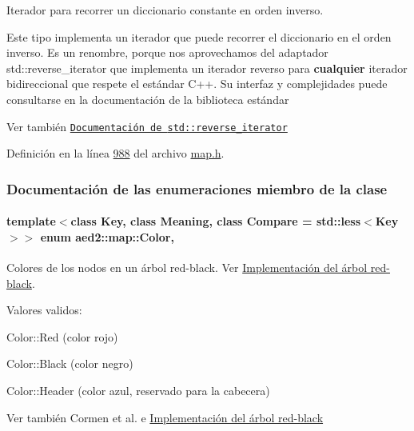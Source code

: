 Iterador para recorrer un diccionario constante en orden inverso. 

Este tipo implementa un iterador que puede recorrer el diccionario en el orden inverso. Es un renombre, porque nos aprovechamos del adaptador {\ttfamily std\+::reverse\+\_\+iterator} que implementa un iterador reverso para {\bfseries cualquier} iterador bidireccional que respete el estándar C++. Su interfaz y complejidades puede consultarse en la documentación de la biblioteca estándar

\begin{DoxySeeAlso}{Ver también}
\href{http://en.cppreference.com/w/cpp/iterator/reverse_iterator}{\tt Documentación de {\ttfamily std\+::reverse\+\_\+iterator}} 
\end{DoxySeeAlso}


Definición en la línea \hyperlink{map_8h_source_l00988}{988} del archivo \hyperlink{map_8h_source}{map.\+h}.



\subsubsection{Documentación de las enumeraciones miembro de la clase}
\paragraph[{\texorpdfstring{Color}{Color}}]{\setlength{\rightskip}{0pt plus 5cm}template$<$class Key, class Meaning, class Compare = std\+::less$<$\+Key$>$$>$ enum {\bf aed2\+::map\+::\+Color}\hspace{0.3cm}{\ttfamily [strong]}, {\ttfamily [private]}}\hypertarget{classaed2_1_1map_a6d62a415a4b9d320b30cada4ebcf9f5b_a6d62a415a4b9d320b30cada4ebcf9f5b}{}\label{classaed2_1_1map_a6d62a415a4b9d320b30cada4ebcf9f5b_a6d62a415a4b9d320b30cada4ebcf9f5b}


Colores de los nodos en un árbol red-\/black. Ver \hyperlink{Implementacion}{Implementación del árbol red-\/black}. 

Valores validos\+: \begin{DoxyItemize}
\item Color\+::\+Red (color rojo) \item Color\+::\+Black (color negro) \item Color\+::\+Header (color azul, reservado para la cabecera)\end{DoxyItemize}
\begin{DoxySeeAlso}{Ver también}
Cormen et al. \cite{CormenLeisersonRivestStein2009} e \hyperlink{Implementacion}{Implementación del árbol red-\/black} 
\end{DoxySeeAlso}


